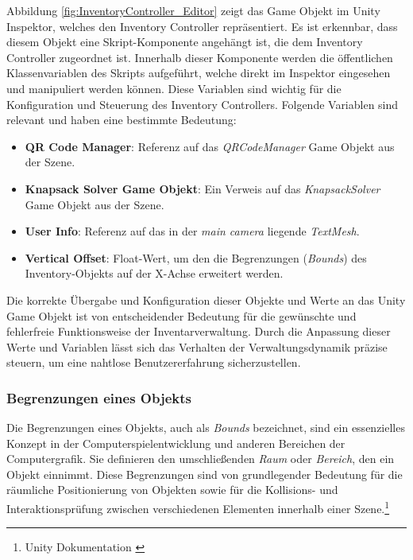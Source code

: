 Abbildung \ref{fig:InventoryController_Editor} zeigt das Game Objekt im Unity Inspektor, welches den Inventory Controller
repräsentiert. Es ist erkennbar, dass diesem Objekt eine Skript-Komponente angehängt ist, die dem Inventory Controller
zugeordnet ist. Innerhalb dieser Komponente werden die öffentlichen Klassenvariablen des Skripts aufgeführt, welche direkt
im Inspektor eingesehen und manipuliert werden können. Diese Variablen sind wichtig für die Konfiguration und Steuerung
des Inventory Controllers. Folgende Variablen sind relevant und haben eine bestimmte Bedeutung:

\begin{itemize}
    \item \textbf{QR Code Manager}: Referenz auf das \textit{QRCodeManager} Game Objekt aus der Szene.

    \item \textbf{Knapsack Solver Game Objekt}: Ein Verweis auf das \textit{KnapsackSolver} Game Objekt aus der Szene.

    \item \textbf{User Info}: Referenz auf das in der \textit{main camera} liegende \textit{TextMesh}.

    \item \textbf{Vertical Offset}: Float-Wert, um den die Begrenzungen (\textit{Bounds}) des Inventory-Objekts auf
    der X-Achse erweitert werden.
\end{itemize}

Die korrekte Übergabe und Konfiguration dieser Objekte und Werte an das Unity Game Objekt ist von entscheidender Bedeutung
für die gewünschte und fehlerfreie Funktionsweise der Inventarverwaltung. Durch die Anpassung dieser Werte und Variablen
lässt sich das Verhalten der Verwaltungsdynamik präzise steuern, um eine nahtlose Benutzererfahrung sicherzustellen.

\subsubsection{Begrenzungen eines Objekts}
Die Begrenzungen eines Objekts, auch als \textit{Bounds} bezeichnet, sind ein essenzielles Konzept in der Computerspielentwicklung
und anderen Bereichen der Computergrafik. Sie definieren den umschließenden \textit{Raum} oder \textit{Bereich}, den ein
Objekt einnimmt. Diese Begrenzungen sind von grundlegender Bedeutung für die räumliche Positionierung von Objekten sowie
für die Kollisions- und Interaktionsprüfung zwischen verschiedenen Elementen innerhalb einer Szene.\footnote{Unity Dokumentation \cite{Bounds}}

